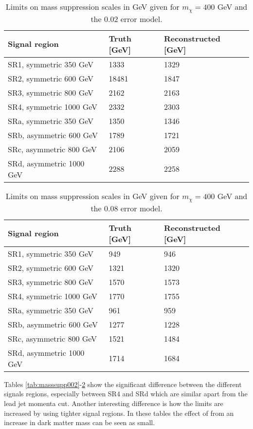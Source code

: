 \begin{table}[ht!]
\begin{center}
\begin{tabular}{|l|l|l|}
\hline
Signal region & Truth [GeV]& Reconstructed [GeV]\\ \hline
SR1, symmetric 350 GeV &1333&1329\\
SR2, symmetric 600 GeV&18481&1847\\
SR3, symmetric 800 GeV&2162&2163\\
SR4, symmetric 1000 GeV&2332&2303\\ \hline
SRa, symmetric 350 GeV&1350&1346\\
SRb, asymmetric 600 GeV&1789&1721\\
SRc, asymmetric 800 GeV&2106&2059\\
SRd, asymmetric 1000 GeV&2288&2258\\ \hline
\end{tabular}
\caption{Limits on mass suppression scales in GeV given for $m_{\chi}=400$ GeV and the 0.02 error model.}
\label{tab:masssupp2002}
\end{center}
\end{table}

\begin{table}[ht]
\begin{center}
\begin{tabular}{|l|l|l|}
\hline
Signal region & Truth [GeV]& Reconstructed [GeV]\\ \hline
SR1, symmetric 350 GeV&949&946\\
SR2, symmetric 600 GeV&1321&1320\\
SR3, symmetric 800 GeV&1570&1573\\
SR4, symmetric 1000 GeV&1770&1755\\ \hline

SRa, symmetric 350 GeV&961&959\\
SRb, asymmetric 600 GeV&1277&1228\\
SRc, asymmetric 800 GeV&1521&1484\\
SRd, asymmetric 1000 GeV&1714&1684\\ \hline
\end{tabular}
\caption{Limits on mass suppression scales in GeV given for $m_{\chi}=400$ GeV and the 0.08 error model.}
\label{tab:masssupp2010}
\end{center}
\end{table}

Tables \ref{tab:masssupp002}-\ref{tab:masssupp2010} show the significant difference between the different signals regions, especially between SR4 and SRd which are similar apart from the lead jet momenta cut. Another interesting difference is how the limits are increased by using tighter signal regions. In these tables the effect of from an increase in dark matter mass can be seen as small.

